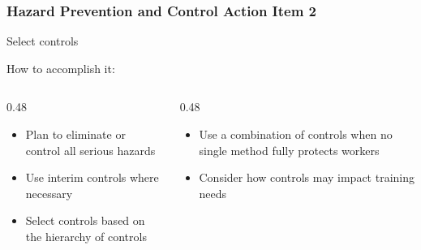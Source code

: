 \begin{frame}
	\frametitle{Hazard Prevention and Control Action Item 2}

    Select controls

    \begin{block}{How to accomplish it:}
        \vspace{-1.5em}
        \begin{columns}[t]
            \begin{column}{0.48\linewidth}
                \begin{itemize}[<+- | alert@+>]
                    \item Plan to eliminate or control all serious hazards
                    \item Use interim controls where necessary
                    \item Select controls based on the hierarchy of controls
                \end{itemize}
            \end{column}
            \begin{column}{0.48\linewidth}
                \begin{itemize}[<+- | alert@+>]
                    \item Use a combination of controls when no single method fully protects workers
                    \item Consider how controls may impact training needs
                \end{itemize}
            \end{column}
        \end{columns}
    \end{block}
\end{frame}

